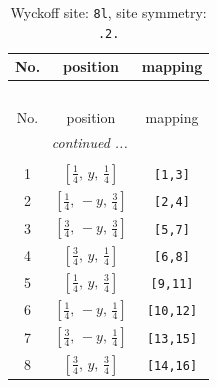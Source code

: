 \documentclass[fleqn,8pt]{jsarticle}
\begin{document}
\begin{longtable}{ccc}
\caption{Wyckoff site: {\tt 8l}, site symmetry: {\tt .2.}}
 \\
 \hline \hline
No. & position & mapping \\ \hline \endfirsthead

\multicolumn{2}{l}{\tablename\ \thetable{}} \\
 \hline \hline
No. & position & mapping \\ \hline \endhead

 \hline \hline
\multicolumn{2}{r}{\footnotesize\it continued ...} \\ \endfoot

 \hline \hline
\multicolumn{2}{r}{} \\ \endlastfoot

1 & $\left[ \frac{1}{4},\, y,\, \frac{1}{4} \right]$ & {\tt [1,3]} \\ \hline
2 & $\left[ \frac{1}{4},\, - y,\, \frac{3}{4} \right]$ & {\tt [2,4]} \\ \hline
3 & $\left[ \frac{3}{4},\, - y,\, \frac{3}{4} \right]$ & {\tt [5,7]} \\ \hline
4 & $\left[ \frac{3}{4},\, y,\, \frac{1}{4} \right]$ & {\tt [6,8]} \\ \hline
5 & $\left[ \frac{1}{4},\, y,\, \frac{3}{4} \right]$ & {\tt [9,11]} \\ \hline
6 & $\left[ \frac{1}{4},\, - y,\, \frac{1}{4} \right]$ & {\tt [10,12]} \\ \hline
7 & $\left[ \frac{3}{4},\, - y,\, \frac{1}{4} \right]$ & {\tt [13,15]} \\ \hline
8 & $\left[ \frac{3}{4},\, y,\, \frac{3}{4} \right]$ & {\tt [14,16]} \\
\end{longtable}
\renewcommand{\arraystretch}{1.2}
\end{document}

